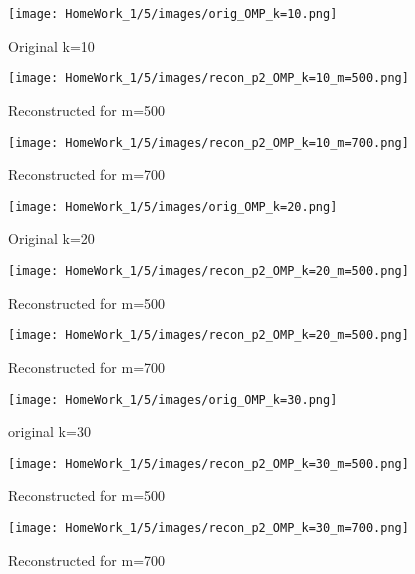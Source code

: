 \documentclass{article}
\begin{document}
\begin{figure}[h!]
    \centering
    \begin{minipage}{0.1\textwidth}
        \texttt{[image: HomeWork\_1/5/images/orig\_OMP\_k=10.png]}
        \caption{Original k=10}
    \end{minipage}
    \hspace{0.5cm}
    \begin{minipage}{0.1\textwidth}
        \centering
        \texttt{[image: HomeWork\_1/5/images/recon\_p2\_OMP\_k=10\_m=500.png]}
        \caption{Reconstructed for m=500}
    \end{minipage}
    \hspace{0.5cm}
    \begin{minipage}{0.1\textwidth}
        \centering
        \texttt{[image: HomeWork\_1/5/images/recon\_p2\_OMP\_k=10\_m=700.png]}
        \caption{Reconstructed for m=700}
    \end{minipage}
\end{figure}

\begin{figure}[h!]
    \centering
    \begin{minipage}{0.1\textwidth}
        \texttt{[image: HomeWork\_1/5/images/orig\_OMP\_k=20.png]}
        \caption{Original k=20}
    \end{minipage}
    \hspace{0.5cm}
    \begin{minipage}{0.1\textwidth}
        \centering
        \texttt{[image: HomeWork\_1/5/images/recon\_p2\_OMP\_k=20\_m=500.png]}
        \caption{Reconstructed for m=500}
    \end{minipage}
    \hspace{0.5cm}
    \begin{minipage}{0.1\textwidth}
        \centering
        \texttt{[image: HomeWork\_1/5/images/recon\_p2\_OMP\_k=20\_m=500.png]}
        \caption{Reconstructed for m=700}
    \end{minipage}
\end{figure}

\begin{figure}[h!]
    \centering
    \begin{minipage}{0.1\textwidth}
        \texttt{[image: HomeWork\_1/5/images/orig\_OMP\_k=30.png]}
        \caption{original k=30}
    \end{minipage}
    \hspace{0.5cm}
    \begin{minipage}{0.1\textwidth}
        \centering
        \texttt{[image: HomeWork\_1/5/images/recon\_p2\_OMP\_k=30\_m=500.png]}
        \caption{Reconstructed for m=500}
    \end{minipage}
    \hspace{0.5cm}
    \begin{minipage}{0.1\textwidth}
        \centering
        \texttt{[image: HomeWork\_1/5/images/recon\_p2\_OMP\_k=30\_m=700.png]}
        \caption{Reconstructed for m=700}
    \end{minipage}
\end{figure}
\end{document}
